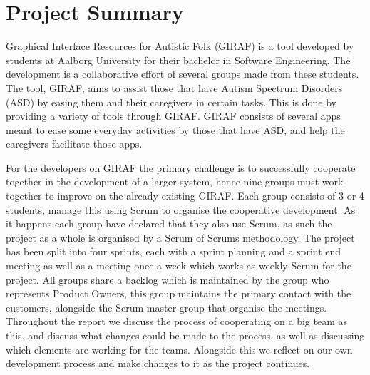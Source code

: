 \chapter{Project Summary}
Graphical Interface Resources for Autistic Folk (GIRAF) is a tool developed by students at Aalborg University for their bachelor in Software Engineering.
The development is a collaborative effort of several groups made from these students.
The tool, GIRAF, aims to assist those that have Autism Spectrum Disorders (ASD) by easing them and their caregivers in certain tasks.
This is done by providing a variety of tools through GIRAF.
GIRAF consists of several apps meant to ease some everyday activities by those that have ASD, and help the caregivers facilitate those apps.

For the developers on GIRAF the primary challenge is to successfully cooperate together in the development of a larger system, hence nine groups must work together to improve on the already existing GIRAF.
Each group consists of 3 or 4 students, manage this using Scrum to organise the cooperative development.
As it happens each group have declared that they also use Scrum, as such the project as a whole is organised by a Scrum of Scrums methodology.
The project has been split into four sprints, each with a sprint planning and a sprint end meeting as well as a meeting once a week which works as weekly Scrum for the project.
All groups share a backlog which is maintained by the group who represents Product Owners, this group maintains the primary contact with the customers, alongside the Scrum master group that organise the meetings.
Throughout the report we discuss the process of cooperating on a big team as this, and discuss what changes could be made to the process, as well as discussing which elements are working for the teams.
Alongside this we reflect on our own development process and make changes to it as the project continues.

